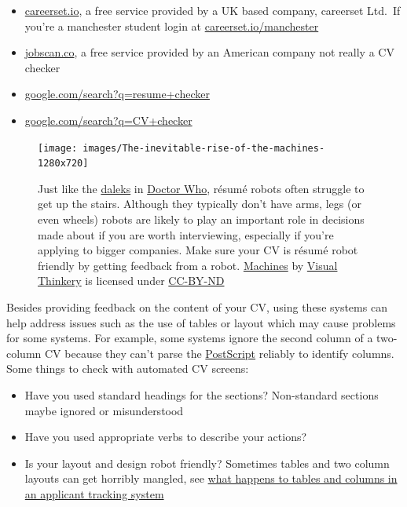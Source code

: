 \documentclass[
]{book}
\providecommand{\tightlist}{%
  \setlength{\itemsep}{0pt}\setlength{\parskip}{0pt}}
\begin{document}
\begin{itemize}
\tightlist
\item
  \href{https://careerset.io}{careerset.io}, a free service provided by a UK based company, careerset Ltd.~If you're a manchester student login at \href{https://careerset.io/manchester}{careerset.io/manchester}
\item
  \href{https://www.jobscan.co}{jobscan.co}, a free service provided by an American company not really a CV checker
\item
  \href{https://www.google.com/search?q=resume+checker}{google.com/search?q=resume+checker}
\item
  \href{https://www.google.com/search?q=cv+checker}{google.com/search?q=CV+checker}
\end{itemize}

\begin{figure}

{\centering \texttt{[image: images/The-inevitable-rise-of-the-machines-1280x720]} 

}

\caption{Just like the \href{https://en.wikipedia.org/wiki/Dalek}{daleks} in \href{https://en.wikipedia.org/wiki/Doctor_Who}{Doctor Who}, résumé robots often struggle to get up the stairs. Although they typically don't have arms, legs (or even wheels) robots are likely to play an important role in decisions made about if you are worth interviewing, especially if you're applying to bigger companies. Make sure your CV is résumé robot friendly by getting feedback from a robot. \href{https://bryanmmathers.com/machines/}{Machines} by \href{https://visualthinkery.com/}{Visual Thinkery} is licensed under \href{https://creativecommons.org/licenses/by-nd/4.0/}{CC-BY-ND}}\label{fig:machines-fig}
\end{figure}



Besides providing feedback on the content of your CV, using these systems can help address issues such as the use of tables or layout which may cause problems for some systems. For example, some systems ignore the second column of a two-column CV because they can't parse the \href{https://en.wikipedia.org/wiki/PostScript}{PostScript} reliably to identify columns. Some things to check with automated CV screens:

\begin{itemize}
\tightlist
\item
  Have you used standard headings for the sections? Non-standard sections maybe ignored or misunderstood
\item
  Have you used appropriate verbs to describe your actions?
\item
  Is your layout and design robot friendly? Sometimes tables and two column layouts can get horribly mangled, see \href{https://www.jobscan.co/blog/resume-tables-columns-ats/}{what happens to tables and columns in an applicant tracking system} \citep{jobscan}
\end{itemize}
\end{document}
